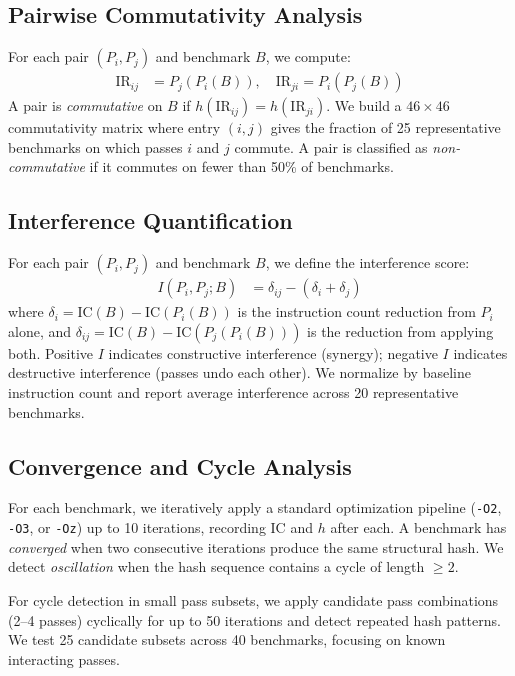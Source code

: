 \documentclass[11pt]{article}
\begin{document}
\subsection{Pairwise Commutativity Analysis}

For each pair $(P_i, P_j)$ and benchmark $B$, we compute:
\begin{align}
  \text{IR}_{ij} &= P_j(P_i(B)), \quad \text{IR}_{ji} = P_i(P_j(B))
\end{align}
A pair is \emph{commutative} on $B$ if $h(\text{IR}_{ij}) = h(\text{IR}_{ji})$. We build a $46 \times 46$ commutativity matrix where entry $(i,j)$ gives the fraction of 25 representative benchmarks on which passes $i$ and $j$ commute. A pair is classified as \emph{non-commutative} if it commutes on fewer than 50\% of benchmarks.

\subsection{Interference Quantification}

For each pair $(P_i, P_j)$ and benchmark $B$, we define the interference score:
\begin{align}
  I(P_i, P_j; B) &= \delta_{ij} - (\delta_i + \delta_j)
\end{align}
where $\delta_i = \text{IC}(B) - \text{IC}(P_i(B))$ is the instruction count reduction from $P_i$ alone, and $\delta_{ij} = \text{IC}(B) - \text{IC}(P_j(P_i(B)))$ is the reduction from applying both. Positive $I$ indicates constructive interference (synergy); negative $I$ indicates destructive interference (passes undo each other). We normalize by baseline instruction count and report average interference across 20 representative benchmarks.

\subsection{Convergence and Cycle Analysis}

For each benchmark, we iteratively apply a standard optimization pipeline (\texttt{-O2}, \texttt{-O3}, or \texttt{-Oz}) up to 10 iterations, recording $\text{IC}$ and $h$ after each. A benchmark has \emph{converged} when two consecutive iterations produce the same structural hash. We detect \emph{oscillation} when the hash sequence contains a cycle of length $\geq 2$.

For cycle detection in small pass subsets, we apply candidate pass combinations (2--4 passes) cyclically for up to 50 iterations and detect repeated hash patterns. We test 25 candidate subsets across 40 benchmarks, focusing on known interacting passes.
\end{document}
